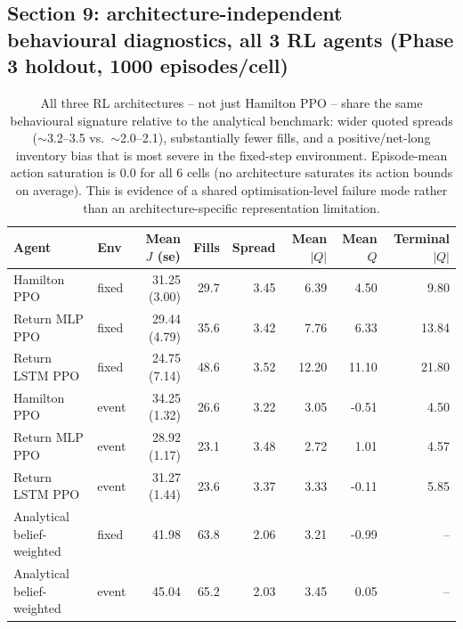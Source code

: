 \subsection*{Section 9: architecture-independent behavioural diagnostics, all 3 RL agents (Phase 3 holdout, 1000 episodes/cell)}
\begin{table}[h]
\centering
\small
\begin{tabular}{llrrrrrr}
\hline
Agent & Env & Mean $J$ (se) & Fills & Spread & Mean $|Q|$ & Mean $Q$ & Terminal $|Q|$ \\
\hline
Hamilton PPO     & fixed & 31.25 (3.00) & 29.7 & 3.45 & 6.39  & 4.50  & 9.80 \\
Return MLP PPO   & fixed & 29.44 (4.79) & 35.6 & 3.42 & 7.76  & 6.33  & 13.84 \\
Return LSTM PPO  & fixed & 24.75 (7.14) & 48.6 & 3.52 & 12.20 & 11.10 & 21.80 \\
\hline
Hamilton PPO     & event & 34.25 (1.32) & 26.6 & 3.22 & 3.05  & -0.51 & 4.50 \\
Return MLP PPO   & event & 28.92 (1.17) & 23.1 & 3.48 & 2.72  &  1.01 & 4.57 \\
Return LSTM PPO  & event & 31.27 (1.44) & 23.6 & 3.37 & 3.33  & -0.11 & 5.85 \\
\hline
Analytical belief-weighted & fixed & 41.98 & 63.8 & 2.06 & 3.21 & -0.99 & -- \\
Analytical belief-weighted & event & 45.04 & 65.2 & 2.03 & 3.45 &  0.05 & -- \\
\hline
\end{tabular}
\caption{All three RL architectures -- not just Hamilton PPO -- share the same behavioural
signature relative to the analytical benchmark: wider quoted spreads ($\sim$3.2--3.5 vs.\ $\sim$2.0--2.1),
substantially fewer fills, and a positive/net-long inventory bias that is most severe in the
fixed-step environment. Episode-mean action saturation is 0.0 for all 6 cells (no architecture
saturates its action bounds on average). This is evidence of a shared optimisation-level failure
mode rather than an architecture-specific representation limitation.}
\end{table}
